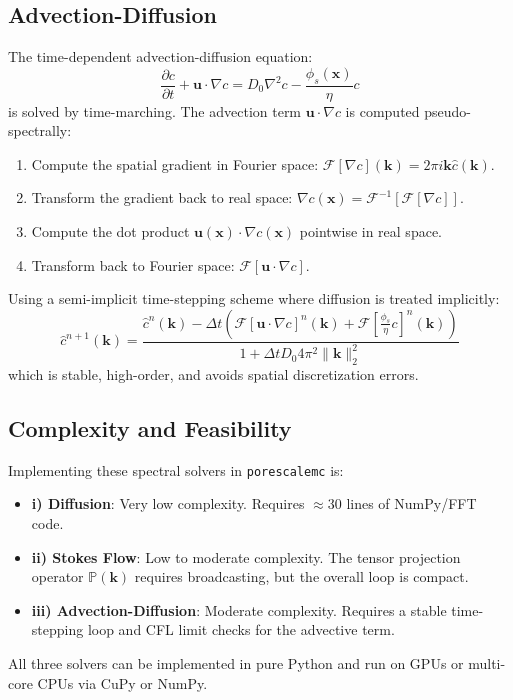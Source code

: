\documentclass[preprint,12pt]{elsarticle}
\newcommand{\x}{\mathbf{x}}
\newcommand{\kvec}{\mathbf{k}}
\newcommand{\bfu}{\mathbf{u}}
\begin{document}
\subsection{Advection-Diffusion}
The time-dependent advection-diffusion equation:
\begin{equation}
\frac{\partial c}{\partial t} + \bfu \cdot \nabla c = D_0 \nabla^2 c - \frac{\phi_s(\x)}{\eta} c
\end{equation}
is solved by time-marching. The advection term $\bfu \cdot \nabla c$ is computed pseudo-spectrally:
\begin{enumerate}
    \item Compute the spatial gradient in Fourier space: $\mathcal{F}[\nabla c](\kvec) = 2\pi i \kvec \widehat{c}(\kvec)$.
    \item Transform the gradient back to real space: $\nabla c(\x) = \mathcal{F}^{-1}[\mathcal{F}[\nabla c]]$.
    \item Compute the dot product $\bfu(\x) \cdot \nabla c(\x)$ pointwise in real space.
    \item Transform back to Fourier space: $\mathcal{F}[\bfu \cdot \nabla c]$.
\end{enumerate}
Using a semi-implicit time-stepping scheme where diffusion is treated implicitly:
\begin{equation}
\widehat{c}^{n+1}(\kvec) = \frac{\widehat{c}^n(\kvec) - \Delta t \left( \mathcal{F}[\bfu \cdot \nabla c]^n(\kvec) + \mathcal{F}\left[ \frac{\phi_s}{\eta} c \right]^n(\kvec) \right)}{1 + \Delta t D_0 4\pi^2 \|\kvec\|_2^2}
\end{equation}
which is stable, high-order, and avoids spatial discretization errors.

\subsection{Complexity and Feasibility}
Implementing these spectral solvers in \texttt{porescalemc} is:
\begin{itemize}
    \item \textbf{i) Diffusion}: Very low complexity. Requires $\approx 30$ lines of NumPy/FFT code.
    \item \textbf{ii) Stokes Flow}: Low to moderate complexity. The tensor projection operator $\mathbb{P}(\kvec)$ requires broadcasting, but the overall loop is compact.
    \item \textbf{iii) Advection-Diffusion}: Moderate complexity. Requires a stable time-stepping loop and CFL limit checks for the advective term.
\end{itemize}
All three solvers can be implemented in pure Python and run on GPUs or multi-core CPUs via CuPy or NumPy.
\end{document}

